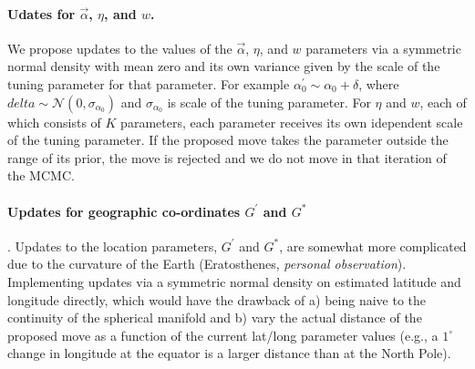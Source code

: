 \documentclass[12pt]{article}
\newcommand{\identifyadmixsource}[1]{{#1^{*}}}
\begin{document}
\paragraph{Udates for $\vec{\alpha}$, $\eta$, and $w$.}
We propose updates to the values of the $\vec{\alpha}$, $\eta$, and $w$ parameters via a symmetric normal density with mean zero and its own variance given by the scale of the tuning parameter for that parameter.  For example $\alpha_0^{\prime} \sim \alpha_0 + \delta$, where $delta \sim \mathcal{N}(0,\sigma_{\alpha_0})$ and $\sigma_{\alpha_0}$ is scale of the tuning parameter.  For $\eta$ and $w$, each of which consists of $K$ parameters, each parameter receives its own idependent scale of the tuning parameter. If the proposed move takes the parameter outside the range of its prior, the move is rejected and we do not move in that iteration of the MCMC.



\paragraph{Updates for geographic co-ordinates $G^{\prime}$ and $\identifyadmixsource{G}$}. Updates to the location parameters, $G^{\prime}$ and $\identifyadmixsource{G}$, are somewhat more complicated due to the curvature of the Earth (Eratosthenes, \textit{personal observation}).  Implementing updates via a symmetric normal density on estimated latitude and longitude directly, which would have the drawback of a) being naive to the continuity of the spherical manifold and b) vary the actual distance of the proposed move as a function of the current lat/long parameter values (e.g., a $1^{\circ}$ change in longitude at the equator is a larger distance than at the North Pole).  
\end{document}
